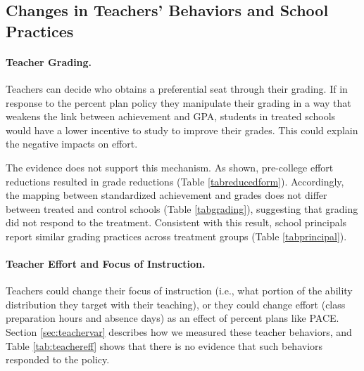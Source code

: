 


\subsection{Changes in Teachers' Behaviors and School Practices}\label{sec:grading}

\paragraph{Teacher Grading.} Teachers can decide who obtains a preferential seat through their grading. If in response to the percent plan policy they manipulate their grading in a way that weakens the link between achievement and GPA, students in treated schools would have a lower incentive to study to improve their grades. This could explain the negative impacts on effort.\par 
The evidence does not support this mechanism. As shown, pre-college effort reductions resulted in grade reductions (Table \ref{tabreducedform}). Accordingly, the mapping between standardized achievement and grades does not differ between treated and control schools (Table \ref{tabgrading}), suggesting that grading did not respond to the treatment. Consistent with this result, school principals report similar grading practices across treatment groups (Table \ref{tabprincipal}).\par 






\paragraph{Teacher Effort and Focus of Instruction.} Teachers could change their focus of instruction (i.e., what portion of the ability distribution they target with their teaching), or they could change effort (class preparation hours and absence days) as an effect of percent plans like PACE. Section \ref{sec:teachervar} describes how we measured these teacher behaviors, and Table \ref{tab:teachereff} shows that there is no evidence that such behaviors responded to the policy.






